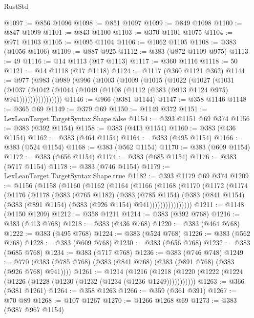 \begin{lexlean}{RustStd}
\begin{coremodule}
@1097 := @856 @1096
@1098 := @851 @1097
@1099 := @849 @1098
@1100 := @847 @1099
@1101 := @843 @1100
@1103 := @370 @1101 @1075
@1104 := @971 @1103
@1105 := @1095 @1104
@1106 := @1062 @1105
@1108 := @383 (@1056 @1106)
@1109 := @887 @925
@1112 := @383 (@872 @1109 @975)
@1113 := 49
@1116 := @14 @1113 (@17 @1113)
@1117 := @360 @1116
@1118 := 50
@1121 := @14 @1118 (@17 @1118)
@1124 := @1117 (@360 @1121 @362)
@1144 := @977
    (@983
      (@989
        (@996
          (@1003
            (@1009
              (@1015
                (@1022
                  (@1027
                    (@1031
                      (@1037
                        (@1042
                          (@1044 (@1049 (@1108 (@1112 (@383 (@913 @1124 @975) @941))))))))))))))))
@1146 := @966 (@381 @1144)
@1147 := @358 @1146
@1148 := @365 @69
@1149 := @379 @69
@1150 := @1149 @372
@1151 := LexLeanTarget.TargetSyntax.Shape.false
@1154 := @393 @1151 @69 @374
@1156 := @383 (@392 @1154)
@1158 := @383 (@413 @1154)
@1160 := @383 (@436 @1154)
@1162 := @383 (@464 @1154)
@1164 := @383 (@495 @1154)
@1166 := @383 (@524 @1154)
@1168 := @383 (@562 @1154)
@1170 := @383 (@609 @1154)
@1172 := @383 (@656 @1154)
@1174 := @383 (@685 @1154)
@1176 := @383 (@717 @1154)
@1178 := @383 (@746 @1154)
@1179 := LexLeanTarget.TargetSyntax.Shape.true
@1182 := @393 @1179 @69 @374
@1209 := @1156
    (@1158
      (@1160
        (@1162
          (@1164
            (@1166
              (@1168
                (@1170
                  (@1172
                    (@1174
                      (@1176
                        (@1178
                          (@383
                            (@765 @1182)
                            (@383
                              (@785 @1154)
                              (@383
                                (@841 @1154)
                                (@383 (@891 @1154) (@383 (@926 @1154) @941))))))))))))))))
@1211 := @1148 (@1150 @1209)
@1212 := @358 @1211
@1214 := @383 (@392 @768)
@1216 := @383 (@413 @768)
@1218 := @383 (@436 @768)
@1220 := @383 (@464 @768)
@1222 := @383 (@495 @768)
@1224 := @383 (@524 @768)
@1226 := @383 (@562 @768)
@1228 := @383 (@609 @768)
@1230 := @383 (@656 @768)
@1232 := @383 (@685 @768)
@1234 := @383 (@717 @768)
@1236 := @383 (@746 @748)
@1249 := @770 (@383 (@785 @768) (@383 (@841 @768) (@383 (@891 @768) (@383 (@926 @768) @941))))
@1261 := @1214
    (@1216 (@1218 (@1220 (@1222 (@1224 (@1226 (@1228 (@1230 (@1232 (@1234 (@1236 @1249)))))))))))
@1263 := @366 (@381 @1261)
@1264 := @358 @1263
@1266 := @359 (@361 @391)
@1267 := @70 @89
@1268 := @107 @1267
@1270 := @1266 @1268 @69
@1273 := @383 (@387 @967 @1154)

\end{coremodule}
\end{lexlean}
